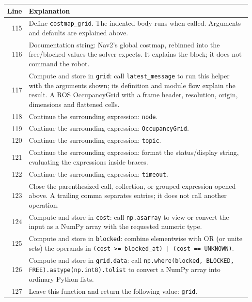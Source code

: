\documentclass[11pt,a4paper]{book}
\begin{document}
\begin{longtable}{r p{}}

\textbf{Line} & \textbf{Explanation} \\ \hline \endhead

115 & Define \texttt{costmap\_grid}. The indented body runs when called. Arguments and defaults are explained above. \\

116 & Documentation string: Nav2's global costmap, rebinned into the free/blocked values the solver expects. It explains the block; it does not command the robot. \\

117 & Compute and store in \texttt{grid}: call \texttt{latest\_message} to run this helper with the arguments shown; its definition and module flow explain the result. A ROS OccupancyGrid with a frame header, resolution, origin, dimensions and flattened cells. \\

118 & Continue the surrounding expression: \texttt{node}. \\

119 & Continue the surrounding expression: \texttt{OccupancyGrid}. \\

120 & Continue the surrounding expression: \texttt{topic}. \\

121 & Continue the surrounding expression: format the status/display string, evaluating the expressions inside braces. \\

122 & Continue the surrounding expression: \texttt{timeout}. \\

123 & Close the parenthesized call, collection, or grouped expression opened above. A trailing comma separates entries; it does not call another operation. \\

124 & Compute and store in \texttt{cost}: call \texttt{np.asarray} to view or convert the input as a NumPy array with the requested numeric type.  \\

125 & Compute and store in \texttt{blocked}: combine elementwise with OR (or unite sets) the operands in \texttt{(cost >= blocked\_at) | (cost == UNKNOWN)}.  \\

126 & Compute and store in \texttt{grid.data}: call \texttt{np.where(blocked, BLOCKED, FREE).astype(np.int8).tolist} to convert a NumPy array into ordinary Python lists.  \\

127 & Leave this function and return the following value: \texttt{grid}. \\

\end{longtable}
\end{document}
